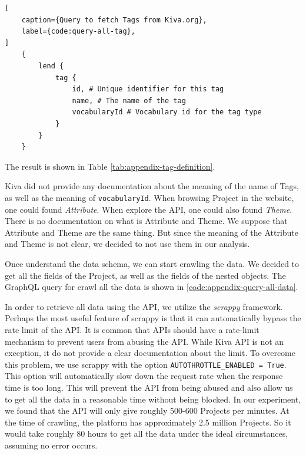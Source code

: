 \begin{minipage}[c]{0.95\textwidth}
	\begin{lstlisting}[
	caption={Query to fetch Tags from Kiva.org},
	label={code:query-all-tag},
]
    {
        lend {
            tag {
                id, # Unique identifier for this tag
                name, # The name of the tag
                vocabularyId # Vocabulary id for the tag type
            }
        }
    }
\end{lstlisting}
\end{minipage}

The result is shown in Table \ref{tab:appendix-tag-definition}.


Kiva did not provide any documentation about the meaning of the name of Tags,
as well as the meaning of \lstinline|vocabularyId|.
When browsing Project in the website, one could found \textit{Attribute}.
When explore the API, one could also found \textit{Theme}.
There is no documentation on what is Attribute and Theme.
We suppose that Attribute and Theme are the same thing.
But since the meaning of the Attribute and Theme is not clear,
we decided to not use them in our analysis.

Once understand the data schema, we can start crawling the data.
We decided to get all the fields of the Project, as well as the fields of the nested objects.
The GraphQL query for crawl all the data is shown in \ref{code:appendix-query-all-data}.

In order to retrieve all data using the API, we utilize the \textit{scrappy}\parencite{scrappy} framework.
Perhaps the most useful feature of scrappy is that it can automatically bypass the rate limit of the API.
It is common that APIs should have a rate-limit mechanism to prevent users from abusing the API.
While Kiva API is not an exception, it do not provide a clear documentation about the limit.
To overcome this problem, we use scrappy with the option \lstinline|AUTOTHROTTLE_ENABLED = True|.
This option will automatically slow down the request rate when the response time is too long.
This will prevent the API from being abused and also allow us to get all the data in a reasonable time without being blocked.
In our experiment, we found that the API will only give roughly 500-600 Projects per minutes.
At the time of crawling, the platform has approximately 2.5 million Projects.
So it would take roughly 80 hours to get all the data under the ideal circumstances, assuming no error occurs.

